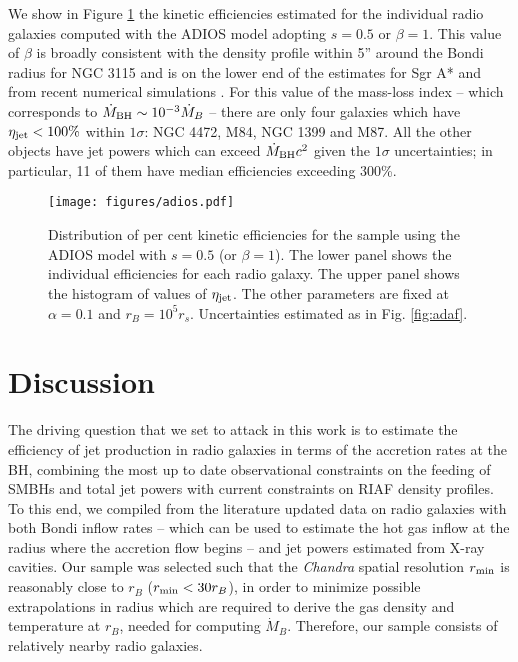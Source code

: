 \documentclass[useAMS,usenatbib]{mn2e}
\begin{document}
We show in Figure \ref{fig:adios} the kinetic efficiencies estimated for the individual radio galaxies computed with the ADIOS model adopting $s=0.5$ or $\beta=1$. This value of $\beta$ is broadly consistent with the density profile within 5'' around the Bondi radius for NGC 3115 \citep{Wong14} and is on the lower end of the estimates for Sgr A* \citep{Baganoff03,Marrone07,Wang13} and from recent numerical simulations \citep{Yuan12,McKinney12,Sadowski13sim}. For this value of the mass-loss index -- which corresponds to $\dot{M}_{\rm BH} \sim 10^{-3} \dot{M}_B$ -- there are only four galaxies which have $\eta_{\rm jet}<100\%$ within $1\sigma$: NGC 4472, M84, NGC 1399 and M87. All the other objects have jet powers which can exceed $\dot{M}_{\rm BH} c^2$ given the $1\sigma$ uncertainties; in particular, 11 of them have median efficiencies exceeding 300\%.

\begin{figure}
\centering
\texttt{[image: figures/adios.pdf]}
\caption{Distribution of per cent kinetic efficiencies for the sample using the ADIOS model with $s=0.5$ (or $\beta=1$). The lower panel shows the individual efficiencies for each radio galaxy. The upper panel shows the histogram of values of $\eta_{\rm jet}$. The other parameters are fixed at $\alpha=0.1$ and $r_B=10^5 r_s$. Uncertainties estimated as in Fig. \ref{fig:adaf}.}
\label{fig:adios}
\end{figure}









\section{Discussion}	\label{sec:disc}

The driving question that we set to attack in this work is to estimate the efficiency of jet production in radio galaxies in terms of the accretion rates at the BH, combining the most up to date observational constraints on the feeding of SMBHs and total jet powers with current constraints on RIAF density profiles. To this end, we compiled from the literature updated data on radio galaxies with both Bondi inflow rates -- which can be used to estimate the hot gas inflow at the radius where the accretion flow begins -- and jet powers estimated from X-ray cavities. Our sample was selected such that the \emph{Chandra} spatial resolution $r_{\rm min}$ is reasonably close to $r_B$ ($r_{\rm min} < 30 r_B$), in order to minimize possible extrapolations in radius which are required to derive the gas density and temperature at $r_B$, needed for computing $\dot{M}_B$. Therefore, our sample consists of relatively nearby radio galaxies.
\end{document}
